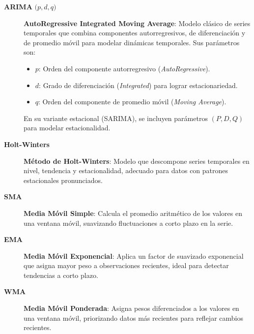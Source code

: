 \begin{description}
\item[\textbf{ARIMA} \(\bigl(p, d, q\bigr)\)] 
\textbf{AutoRegressive Integrated Moving Average}:  
Modelo clásico de series temporales que combina componentes autorregresivos, de diferenciación y de promedio móvil para modelar dinámicas temporales. Sus parámetros son:
\begin{itemize}
  \item \(p\): Orden del componente autorregresivo (\emph{AutoRegressive}).
  \item \(d\): Grado de diferenciación (\emph{Integrated}) para lograr estacionariedad.
  \item \(q\): Orden del componente de promedio móvil (\emph{Moving Average}).
\end{itemize}
En su variante estacional (SARIMA), se incluyen parámetros \((P, D, Q)\) para modelar estacionalidad.

\item[\textbf{Holt-Winters}] 
\textbf{Método de Holt-Winters}:  
Modelo que descompone series temporales en nivel, tendencia y estacionalidad, adecuado para datos con patrones estacionales pronunciados.

\item[\textbf{SMA}] 
\textbf{Media Móvil Simple}:  
Calcula el promedio aritmético de los valores en una ventana móvil, suavizando fluctuaciones a corto plazo en la serie.

\item[\textbf{EMA}] 
\textbf{Media Móvil Exponencial}:  
Aplica un factor de suavizado exponencial que asigna mayor peso a observaciones recientes, ideal para detectar tendencias a corto plazo.

\item[\textbf{WMA}] 
\textbf{Media Móvil Ponderada}:  
Asigna pesos diferenciados a los valores en una ventana móvil, priorizando datos más recientes para reflejar cambios recientes.


\end{description}
